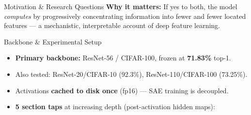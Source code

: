 \documentclass[final]{beamer}
\newlength{\colwidth}
\begin{document}
\begin{frame}[t]
\begin{columns}[t]
\begin{column}{\colwidth}
\begin{block}{Motivation \& Research Questions}
\vspace{0.4em}
\textbf{Why it matters:}  If yes to both, the model \emph{computes} by progressively
concentrating information into fewer and fewer located features --- a mechanistic,
interpretable account of deep feature learning.
\end{block}

\vspace{0.5em}

\begin{block}{Backbone \& Experimental Setup}
\small
\begin{itemize}[leftmargin=1.5em, itemsep=2pt]
  \item \textbf{Primary backbone:} ResNet-56 / CIFAR-100, frozen at \textbf{71.83\%} top-1.
  \item Also tested: ResNet-20/CIFAR-10 (92.3\%), ResNet-110/CIFAR-100 (73.25\%).
  \item Activations \textbf{cached to disk once} (fp16) --- SAE training is decoupled.
  \item \textbf{5 section taps} at increasing depth (post-activation hidden maps):
\end{itemize}

\vspace{0.4em}
\begin{center}
\end{center}


\end{block}
\end{column}
\end{columns}
\end{frame}
\end{document}
